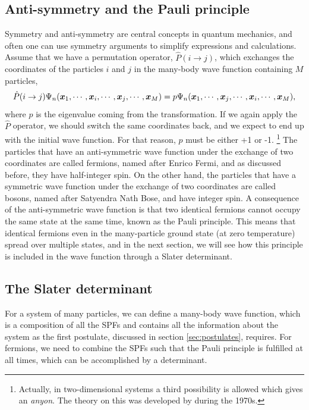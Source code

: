 \subsection{Anti-symmetry and the Pauli principle} \label{sec:symmetry}
Symmetry and anti-symmetry are central concepts in quantum mechanics, and often one can use symmetry arguments to simplify expressions and calculations. Assume that we have a permutation operator, $\hat{P}(i\rightarrow j)$, which exchanges the coordinates of the particles $i$ and $j$ in the many-body wave function containing $M$ particles,
\begin{equation}
\hat{P}(i\rightarrow j)\Psi_n(\boldsymbol{{x}}_1,\cdots,\boldsymbol{{x}}_i,\cdots,\boldsymbol{{x}}_j,\cdots,\boldsymbol{{x}}_M)=p\Psi_n(\boldsymbol{{x}}_1,\cdots,\boldsymbol{{x}}_j,\cdots,\boldsymbol{{x}}_i,\cdots,\boldsymbol{{x}}_M),
\end{equation}
where $p$ is the eigenvalue coming from the transformation. If we again apply the $\hat{P}$ operator, we should switch the same coordinates back, and we expect to end up with the initial wave function. For that reason, $p$ must be either +1 or -1. \footnote{Actually, in two-dimensional systems a third possibility is allowed which gives an \textit{anyon}. The theory on this was developed by \citet{leinaas_one_1977} during the 1970s.} The particles that have an anti-symmetric wave function under the exchange of two coordinates are called fermions, named after Enrico Fermi, and as discussed before, they have half-integer spin. On the other hand, the particles that have a symmetric wave function under the exchange of two coordinates are called bosons, named after Satyendra Nath Bose, and have integer spin. A consequence of the anti-symmetric wave function is that two identical fermions cannot occupy the same state at the same time, known as the Pauli principle. This means that identical fermions even in the many-particle ground state (at zero temperature) spread over multiple states, and in the next section, we will see how this principle is included in the wave function through a Slater determinant. 

\subsection{The Slater determinant} \label{sec:slater}
For a system of many particles, we can define a many-body wave function, which is a composition of all the SPFs and contains all the information about the system as the first postulate, discussed in section \ref{sec:postulates}, requires. For fermions, we need to combine the SPFs such that the Pauli principle is fulfilled at all times, which can be accomplished by a determinant. 

